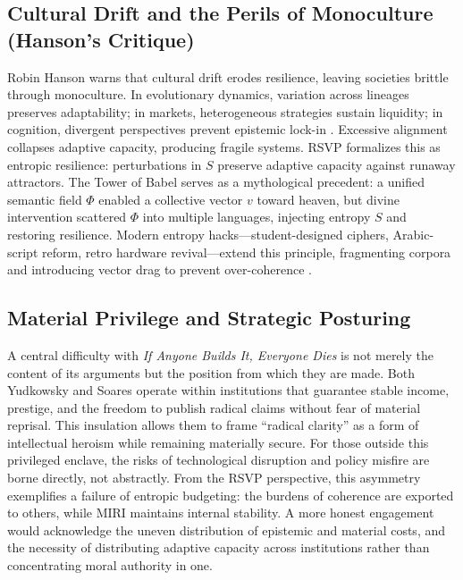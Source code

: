 \documentclass[12pt]{article}
\begin{document}
\subsection{Cultural Drift and the Perils of Monoculture (Hanson’s Critique)}
Robin Hanson \citep{hanson2024culturaldrift} warns that cultural drift erodes resilience, leaving societies brittle through monoculture. In evolutionary dynamics, variation across lineages preserves adaptability; in markets, heterogeneous strategies sustain liquidity; in cognition, divergent perspectives prevent epistemic lock-in \citep{hanson2024culturaldrift}. Excessive alignment collapses adaptive capacity, producing fragile systems. RSVP formalizes this as entropic resilience: perturbations in $S$ preserve adaptive capacity against runaway attractors. The Tower of Babel \citep{genesis11} serves as a mythological precedent: a unified semantic field $\Phi$ enabled a collective vector $v$ toward heaven, but divine intervention scattered $\Phi$ into multiple languages, injecting entropy $S$ and restoring resilience. Modern entropy hacks—student-designed ciphers, Arabic-script reform, retro hardware revival—extend this principle, fragmenting corpora and introducing vector drag to prevent over-coherence \citep{hanson2024culturaldrift}.

\subsection{Material Privilege and Strategic Posturing}
A central difficulty with \textit{If Anyone Builds It, Everyone Dies} is not merely the content of its arguments but the position from which they are made. 
Both Yudkowsky and Soares operate within institutions that guarantee stable income, prestige, and the freedom to publish radical claims without fear of material reprisal. 
This insulation allows them to frame “radical clarity” as a form of intellectual heroism while remaining materially secure. 
For those outside this privileged enclave, the risks of technological disruption and policy misfire are borne directly, not abstractly. 
From the RSVP perspective, this asymmetry exemplifies a failure of entropic budgeting: the burdens of coherence are exported to others, while MIRI maintains internal stability. 
A more honest engagement would acknowledge the uneven distribution of epistemic and material costs, and the necessity of distributing adaptive capacity across institutions rather than concentrating moral authority in one.
\end{document}

